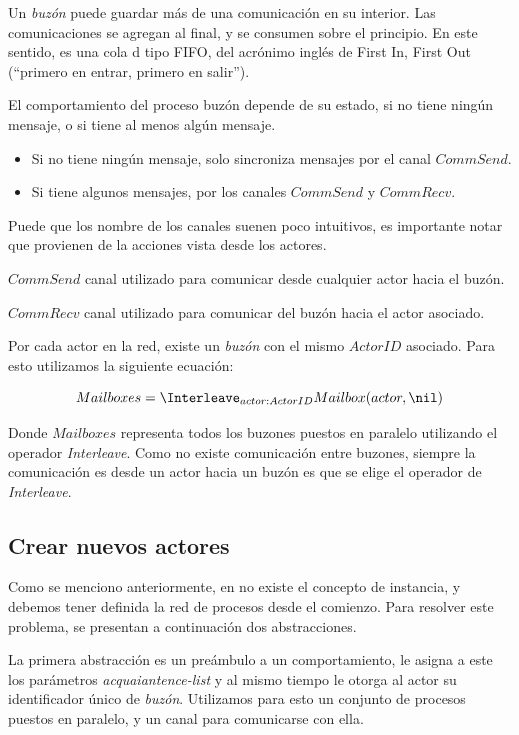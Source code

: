 Un \textit{buzón} puede guardar más de una comunicación en su interior. Las comunicaciones se agregan al final, y se consumen sobre el principio. En este sentido, es una cola d tipo FIFO, del acrónimo inglés de First In, First Out (``primero en entrar, primero en salir'').

El comportamiento del proceso buzón depende de su estado, si no tiene ningún mensaje, o si tiene al menos algún mensaje. 

\begin{itemize}
\item Si no tiene ningún mensaje, solo sincroniza mensajes por el canal $CommSend$.
\item Si tiene algunos mensajes, por los canales $CommSend$ y $CommRecv$.
\end{itemize}

Puede que los nombre de los canales suenen poco intuitivos, es importante notar que provienen de la acciones vista desde los actores.

\begin{description}
\item $CommSend$ canal utilizado para comunicar desde cualquier actor hacia el buzón.
\item $CommRecv$ canal utilizado para comunicar del buzón hacia el actor asociado.
\end{description}

Por cada actor en la red, existe un \textit{buzón} con el mismo $ActorID$ asociado. Para esto utilizamos la siguiente ecuación:

\[
Mailboxes = \Interleave_{ actor : ActorID } Mailbox(actor, \nil) 
\]

Donde $Mailboxes$ representa todos los buzones puestos en paralelo utilizando el operador \textit{Interleave}. Como no existe comunicación entre buzones, siempre la comunicación es desde un actor hacia un buzón es que se elige el operador de \textit{Interleave}.

\subsection{Crear nuevos actores}\label{modelo:crear}

Como se menciono anteriormente, en \CSP no existe el concepto de instancia, y debemos tener definida la red de procesos desde el comienzo. Para resolver este problema, se presentan a continuación dos abstracciones.

La primera abstracción es un preámbulo a un comportamiento, le asigna a este los parámetros \textit{acquaiantence-list} y al mismo tiempo le otorga al actor su identificador único de \textit{buzón}. Utilizamos para esto un conjunto de procesos puestos en paralelo, y un canal para comunicarse con ella.

